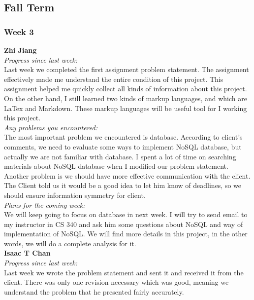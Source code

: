 \subsection{Fall Term}
\subsubsection{Week 3}

\textbf{Zhi Jiang}\\
\noindent\textit{Progress since last week:}\\
Last week we completed the first assignment problem statement. The assignment effectively made me understand the entire condition of this project. This assignment helped me quickly collect all kinds of information about this project. On the other hand, I still learned two kinds of markup languages, and which are LaTex and Markdown. These markup languages will be useful tool for I working this project.\\

\noindent\textit{Any problems you encountered:}\\
\noindent The most important problem we encountered is database. According to client's comments, we need to evaluate some ways to implement NoSQL database, but actually we are not familiar with database. I spent a lot of time on searching materials about NoSQL database when I modified our problem statement. Another problem is we should have more effective communication with the client. The Client told us it would be a good idea to let him know of deadlines, so we should ensure information symmetry for client.\\

\noindent\textit{Plans for the coming week:}\\
\noindent We will keep going to focus on database in next week. I will try to send email to my instructor in CS 340 and ask him some questions about NoSQL and way of implementation of NoSQL. We will find more details in this project, in the other words, we will do a complete analysis for it. \\

\noindent\textbf{Isaac T Chan}\\
\noindent\textit{Progress since last week:}\\
\noindent Last week we wrote the problem statement and sent it and received it from the client. There was only one revision necessary which was good, meaning we understand the problem that he presented fairly accurately.\\

